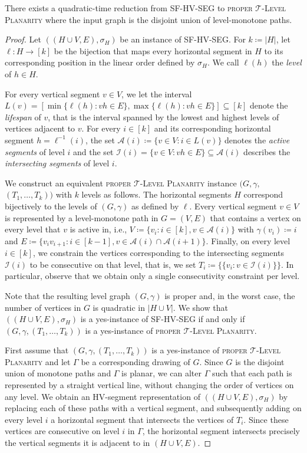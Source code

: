 \documentclass[runningheads]{llncs}
\newcommand{\tlp}{\textsc{proper $\mathcal T$-Level Planarity}\xspace}
\newcommand{\hvp}{\textsc{SF-HV-SEG}\xspace}
\begin{document}
\begin{theorem}
  \label{thm:hv-to-rtlp}
  There exists a quadratic-time reduction from \hvp to \tlp where the input graph is the disjoint union of level-monotone paths.
\end{theorem}
\begin{proof}
  Let $((H \cup V, E), \sigma_H)$ be an instance of \hvp.
  For $k \coloneqq |H|$, let $\ell: H \to [k]$ be the bijection that maps every horizontal segment in $H$ to its corresponding position in the linear order defined by $\sigma_H$.
  We call $\ell(h)$ the \emph{level} of $h \in H$.
   
  For every vertical segment $v \in V$, we let the interval $L(v) = [\min\{\ell(h) : vh \in E\}, \max\{\ell(h) : vh \in E\}] \subseteq [k]$ denote the \emph{lifespan} of $v$, that is the interval spanned by the lowest and highest levels of vertices adjacent to $v$.
  For every $i \in [k]$ and its corresponding horizontal segment $h = \ell^{-1}(i)$, the set $\mathcal A(i) \coloneqq \{v \in V : i \in L(v)\}$ denotes the \emph{active segments} of level $i$ and the set $\mathcal I(i) = \{v \in V : vh \in E\} \subseteq \mathcal A(i)$ describes the \emph{intersecting segments} of level $i$.
  
  We construct an equivalent \tlp instance $(G, \gamma,$ $(T_1, \dots, T_k))$ with $k$ levels as follows.
  The horizontal segments $H$ correspond bijectively to the levels of $(G, \gamma)$ as defined by $\ell$.
  Every vertical segment $v \in V$ is represented by a level-monotone path in $G=(V,E)$ that contains a vertex on every level that $v$ is active in, i.e., $V \coloneqq \{v_i : i \in [k], v \in \mathcal A(i)\}$ with $\gamma(v_i) \coloneqq i$ and $E \coloneqq \{v_iv_{i+1} : i \in [k-1], v \in \mathcal A(i) \cap \mathcal A(i+1)\}$.
  Finally, on every level $i \in [k]$, we constrain the vertices corresponding to the intersecting segments $\mathcal I(i)$ to be consecutive on that level, that is, we set $T_i \coloneqq \{\{v_i : v \in \mathcal I(i)\}\}$.
  In particular, observe that we obtain only a single consecutivity constraint per level.
  
  Note that the resulting level graph $(G, \gamma)$ is proper and, in the worst case, the number of vertices in $G$ is quadratic in $|H \cup V|$.
  We show that $((H \cup V, E), \sigma_H)$ is a yes-instance of \hvp if and only if $(G, \gamma, (T_1, \dots, T_k))$ is a yes-instance of \tlp.
  
  First assume that $(G, \gamma, (T_1, \dots, T_k))$ is a yes-instance of \tlp and let $\Gamma$ be a corresponding drawing of $G$.
  Since $G$ is the disjoint union of monotone paths and $\Gamma$ is planar, we can alter $\Gamma$ such that each path is represented by a straight vertical line, without changing the order of vertices on any level.
  We obtain an HV-segment representation of $((H \cup V, E), \sigma_H)$ by replacing each of these paths with a vertical segment, and subsequently adding on every level $i$ a horizontal segment that intersects the vertices of $T_i$.
  Since these vertices are consecutive on level $i$ in $\Gamma$, the horizontal segment intersects precisely the vertical segments it is adjacent to in $(H \cup V, E)$.
  

\end{proof}
\end{document}
